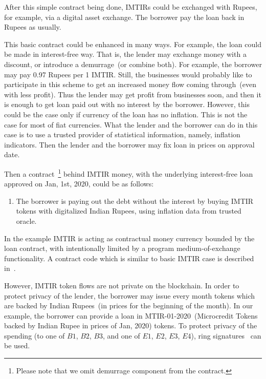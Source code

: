 \documentclass[]{llncs}   %
\begin{document}
 After this simple contract being done, IMTIRs could be exchanged with Rupees, for example, via a digital asset exchange. The borrower
 pay the loan back in Rupees as usually. 

 This basic contract could be enhanced in many ways. For example, the loan could be made in interest-free way. That is,
 the lender may exchange money with a discount, or introduce a demurrage~(or combine both). For example, the borrower may pay 
 0.97 Rupees per 1 IMTIR. Still, the businesses would probably like to participate in this scheme to get an increased money flow coming through~(even with less profit). Thus the lender may get profit from businesses soon, and then it is enough to get loan paid out with no interest by the borrower. However, this could be the case only if currency of the loan has no inflation. This is not the case for most of fiat currencies. What the lender and the borrower can do in this case is to use a trusted provider of statistical
 information, namely, inflation indicators. Then the lender and the borrower may fix loan in prices on approval date.

  Then a contract~\footnote{Please note that we omit demurrage component from
 the contract.} behind IMTIR money, with the underlying interest-free loan approved on Jan, 1st, 2020,
 could be as follows:

 \begin{enumerate}
        \item{} The borrower is paying out the debt without the interest by buying IMTIR tokens with digitalized Indian 
    Rupees, using inflation data from trusted oracle.
 \end{enumerate}

 
 In the example IMTIR is acting as contractual money currency bounded by the loan contract, with intentionally limited by a
 program medium-of-exchange functionality. A contract code which is similar to basic IMTIR case is described in~\cite{scpeople}.

 However, IMTIR token flows are not private on the blockchain. In order to protect privacy of the lender, the borrower
 may issue every month tokens which are backed by Indian Rupees~(in prices for the beginning of the month). In our example, the
 borrower can provide a loan in MTIR-01-2020~(Microcredit Tokens backed by Indian Rupee in prices of
 Jan, 2020) tokens. To protect privacy of the spending (to one of $B1$, $B2$, $B3$, and one of $E1$, $E2$, $E3$, $E4$), ring
 signatures~\cite{rivest2001leak} can be used.
\end{document}
